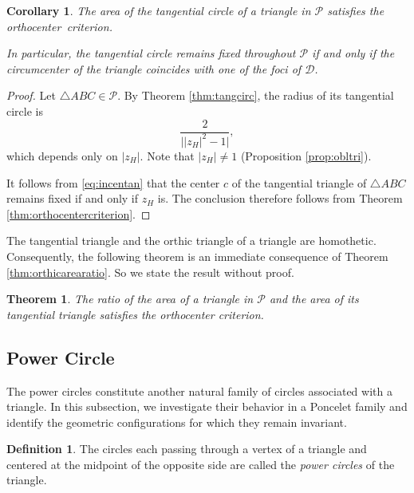 \documentclass[11pt,reqno]{amsart}
\newtheorem{theorem}{Theorem}[section]
\newtheorem{corollary}{Corollary}[section]
\theoremstyle{definition}
\newtheorem{definition}{Definition}[section]
\numberwithin{equation}{section}
\begin{document}
\begin{corollary}
The area of the tangential circle of a triangle  in $\mathcal P$ satisfies the orthocenter \,criterion.

In particular, the tangential circle remains fixed throughout $\mathcal P$ if and only if the circumcenter of the triangle coincides with one of the foci of $\mathcal D$. 
\end{corollary}

\begin{proof}
Let $\triangle ABC \in \mathcal P$. By Theorem \ref{thm:tangcirc},
the radius of its tangential circle is
\[
\frac{2}{\bigl||z_H|^2-1\bigr|},
\]
which depends only on $|z_H|$. Note that $|z_H| \neq 1$ (Proposition \ref{prop:obltri}).

It follows from \eqref{eq:incentan} that the center $c$ of the tangential triangle of $\triangle 
ABC$ remains fixed if and only if $z_H$ is. The conclusion therefore follows from
Theorem \ref{thm:orthocentercriterion}.
\end{proof}

The tangential triangle and the orthic triangle of a triangle are homothetic. Consequently, the following theorem is an immediate consequence of Theorem \ref{thm:orthicarearatio}. So we state the result without proof.

\begin{theorem}
The ratio of the area of a triangle in $\mathcal P$ and the area of its tangential triangle satisfies the orthocenter criterion. 
\end{theorem}



\subsection{Power Circle}\label{sec:powcirc}
The power circles constitute another natural family of circles associated with a triangle. In this subsection, we investigate their behavior in a Poncelet family and identify the geometric configurations for which they remain invariant.
\begin{definition}
   The circles each passing through a vertex of a triangle and centered at the midpoint of the opposite side are called the \emph{power circles} of the triangle.
\end{definition}
\end{document}
